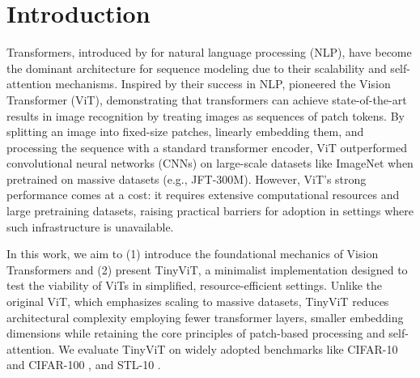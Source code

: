 \section{Introduction}

Transformers, introduced by \cite{vaswani2017attention} for natural language processing (NLP), have become the dominant architecture for sequence modeling due to their scalability and self-attention mechanisms. Inspired by their success in NLP, \cite{alexey2020image} pioneered the Vision Transformer (ViT), demonstrating that transformers can achieve state-of-the-art results in image recognition by treating images as sequences of patch tokens. By splitting an image into fixed-size patches, linearly embedding them, and processing the sequence with a standard transformer encoder, ViT outperformed convolutional neural networks (CNNs) \cite{he2016deep} on large-scale datasets like ImageNet when pretrained on massive datasets (e.g., JFT-300M). However, ViT’s strong performance comes at a cost: it requires extensive computational resources and large pretraining datasets, raising practical barriers for adoption in settings where such infrastructure is unavailable.

In this work, we aim to (1) introduce the foundational mechanics of Vision Transformers and (2) present TinyViT, a minimalist implementation designed to test the viability of ViTs in simplified, resource-efficient settings. Unlike the original ViT, which emphasizes scaling to massive datasets, TinyViT reduces architectural complexity employing fewer transformer layers, smaller embedding dimensions while retaining the core principles of patch-based processing and self-attention. We evaluate TinyViT on widely adopted benchmarks like CIFAR-10 and CIFAR-100 \cite{krizhevsky2009learning}, and STL-10 \cite{coates2011analysis}.